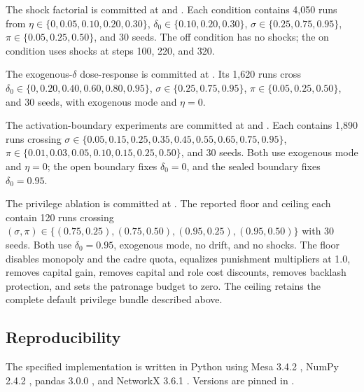 \documentclass[12pt]{article}
\begin{document}
The shock factorial is committed at
 and
. Each condition contains
4,050 runs from \(\eta\in\{0,\allowbreak 0.05,\allowbreak 0.10,\allowbreak
0.20,\allowbreak 0.30\}\), \(\delta_0\in\{0.10,0.20,0.30\}\),
\(\sigma\in\{0.25,0.75,0.95\}\), \(\pi\in\{0.05,0.25,0.50\}\), and 30 seeds. The
off condition has no shocks; the on condition uses shocks at steps 100, 220, and
320.

The exogenous-\(\delta\) dose-response is committed at
. Its 1,620 runs cross
\(\delta_0\in\{0,\allowbreak 0.20,\allowbreak 0.40,\allowbreak 0.60,\allowbreak
0.80,\allowbreak 0.95\}\), \(\sigma\in\{0.25,0.75,0.95\}\),
\(\pi\in\{0.05,0.25,0.50\}\), and 30 seeds, with exogenous mode and \(\eta=0\).

The activation-boundary experiments are committed at
 and
. Each contains 1,890 runs
crossing \(\sigma\in\{0.05,\allowbreak 0.15,\allowbreak 0.25,\allowbreak
0.35,\allowbreak 0.45,\allowbreak 0.55,\allowbreak 0.65,\allowbreak
0.75,\allowbreak 0.95\}\), \(\pi\in\{0.01,\allowbreak 0.03,\allowbreak
0.05,\allowbreak 0.10,\allowbreak 0.15,\allowbreak 0.25,\allowbreak 0.50\}\), and
30 seeds. Both use exogenous mode and \(\eta=0\); the open boundary fixes
\(\delta_0=0\), and the sealed boundary fixes \(\delta_0=0.95\).

The privilege ablation is committed at
. The reported floor and
ceiling each contain 120 runs crossing \((\sigma,\pi)\in\{(0.75,0.25),\allowbreak
(0.75,0.50),\allowbreak (0.95,0.25),\allowbreak (0.95,0.50)\}\) with 30 seeds.
Both use \(\delta_0=0.95\), exogenous mode, no drift, and no shocks. The floor
disables monopoly and the cadre quota, equalizes punishment multipliers at 1.0,
removes capital gain, removes capital and role cost discounts, removes backlash
protection, and sets the patronage budget to zero. The ceiling retains the
complete default privilege bundle described above.

\subsection{Reproducibility}

The specified implementation is written in Python using Mesa 3.4.2
\citep{mesa2020}, NumPy 2.4.2 \citep{numpy2020}, pandas 3.0.0
\citep{pandas2010}, and NetworkX 3.6.1 \citep{networkx2008}. Versions are pinned
in .
\end{document}
